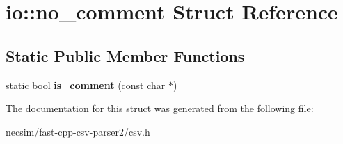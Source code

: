 \hypertarget{structio_1_1no__comment}{}\section{io\+:\+:no\+\_\+comment Struct Reference}
\label{structio_1_1no__comment}
\subsection*{Static Public Member Functions}
\begin{DoxyCompactItemize}
\item 
static bool {\bfseries is\+\_\+comment} (const char $\ast$)\hypertarget{structio_1_1no__comment_a52b252547482e28edd076ee2224bc8d8}{}\label{structio_1_1no__comment_a52b252547482e28edd076ee2224bc8d8}

\end{DoxyCompactItemize}


The documentation for this struct was generated from the following file\+:\begin{DoxyCompactItemize}
\item 
necsim/fast-\/cpp-\/csv-\/parser2/csv.\+h\end{DoxyCompactItemize}

